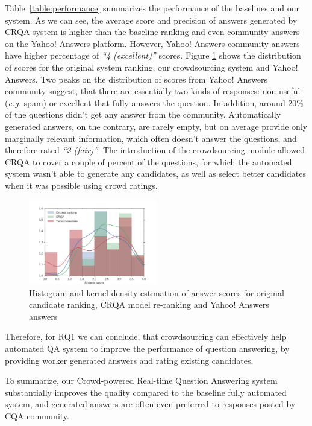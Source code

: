 Table~\ref{table:performance} summarizes the performance of the baselines and our system.
As we can see, the average score and precision of answers generated by CRQA system is higher than the baseline ranking and even community answers on the Yahoo! Answers platform.
However, Yahoo! Answers community answers have higher percentage of \textit{``4 (excellent)''} scores.
Figure \ref{fig:score_histogram} shows the distribution of scores for the original system ranking, our crowdsourcing system and Yahoo! Answers.
Two peaks on the distribution of scores from Yahoo! Answers community suggest, that there are essentially two kinds of responses: non-useful (\textit{e.g.} spam) or excellent that fully answers the question.
In addition, around 20\% of the questions didn't get any answer from the community.
Automatically generated answers, on the contrary, are rarely empty, but on average provide only marginally relevant information, which often doesn't answer the questions, and therefore rated \textit{``2 (fair)''}.
The introduction of the crowdsourcing module allowed CRQA to cover a couple of percent of the questions, for which the automated system wasn't able to generate any candidates, as well as select better candidates when it was possible using crowd ratings.

\begin{figure}[h]
	\centering
	\includegraphics[width=0.5\textwidth]{img/score_hist}
	\caption{Histogram and kernel density estimation of answer scores for original candidate ranking, CRQA model re-ranking and Yahoo! Answers answers}
	\label{fig:score_histogram}
\end{figure}

Therefore, for RQ1 we can conclude, that crowdsourcing can effectively help automated QA system to improve the performance of question answering, by providing worker generated answers and rating existing candidates.

To summarize, our Crowd-powered Real-time Question Answering system substantially improves the quality compared to the baseline fully automated system, and generated answers are often even preferred to responses posted by CQA community.